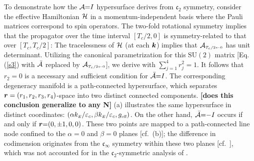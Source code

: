 \documentclass[aps, prb, showpacs, twocolumn, notitlepage, superscriptaddress]{revtex4-1}
\begin{document}
To demonstrate how the ${\cal A}{=}I$ hypersurface derives from $\mathfrak{c}_2$ symmetry, consider  the effective Hamiltonian ${\cal H}$ 
in a momentum-independent basis where the Pauli matrices correspond to spin operators. The two-fold rotational symmetry 
implies that the propagator over the time interval $[T_c/2,0]$ is symmetry-related to that over $[T_c,T_c/2]$:
The tracelessness of ${\cal H}$ (at each $\boldsymbol{k}$) implies that  ${{\cal A}}_{\scriptscriptstyle{T_c/2\leftarrow 0}}$  has unit determinant. 
Utilizing the canonical parametrization for this $\text{SU}(2)$ matrix [Eq. (\ref{s3}) with ${\cal \bar{A}}$ replaced by ${{\cal A}}_{\scriptscriptstyle{T_c/2\leftarrow 0}}$], we derive 
with $\sum_{j=1}^4r_j^2{=}1$. It follows that $r_2{=}0$ is a necessary and sufficient condition for ${\cal \bar{A}}{=}I$. The corresponding degeneracy manifold is a  path-connected hypersurface, which separates $\boldsymbol{r}=(r_1,r_2,r_3,r_4)$-space into two distinct connected components. \textbf{[does this conclusion generalize to any N]} (a) illustrates the same hypersurface in distinct coordinates: $(\alpha k_{\scriptscriptstyle{E}}/\varepsilon_c,\beta k_{\scriptscriptstyle{E}}/\varepsilon_c,g_{\scriptscriptstyle{\text{eff}}})$. On the other hand, ${\cal \bar{A}}{=}{-}I$ occurs if and only if $\boldsymbol{r}{=}(0,\pm 1,0,0)$. These two points are mapped to a path-connected line node confined to the $\alpha{=}0$ and $\beta{=}0$ planes [cf.\ (b)]; the difference in codimension originates from the  $\mathfrak{c}_{\infty}$ symmetry within these two planes [cf.\ ], which was not accounted for in the $\mathfrak{c}_2$-symmetric analysis of . 

\end{document}
